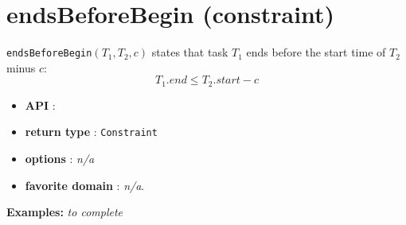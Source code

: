 \section{endsBeforeBegin (constraint)}\label{endsbeforebegin:endsbeforebeginconstraint}\hypertarget{endsbeforebegin:endsbeforebeginconstraint}{}
\begin{notedef}
\texttt{endsBeforeBegin}$(T_1,T_2,c)$  states that task $T_1$ ends before the start time of $T_2$ minus $c$:
  $$T_{1}.end \le T_{2}.start - c$$
\end{notedef}

\begin{itemize}
	\item \textbf{API} :
	\item \textbf{return type} : \texttt{Constraint}
	\item \textbf{options} : \emph{n/a}
	\item \textbf{favorite domain} : \emph{n/a}.
\end{itemize}

\textbf{Examples:}
%
\emph{to complete}
